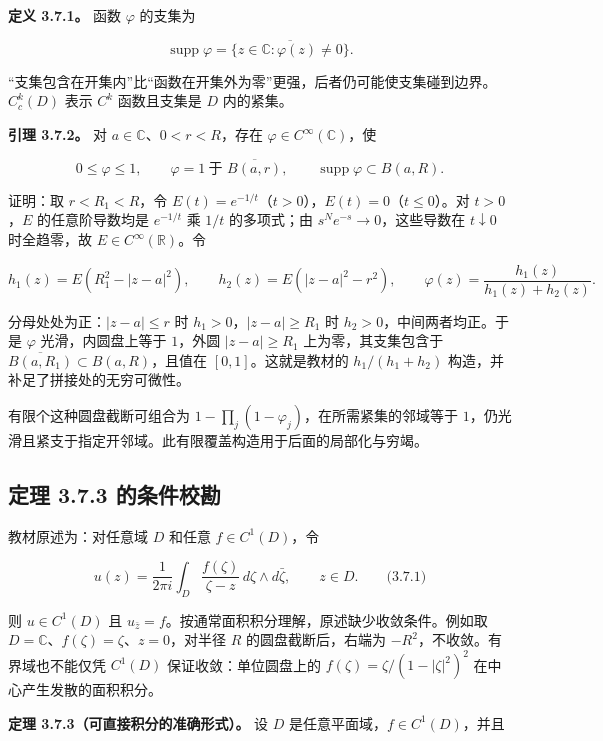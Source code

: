 \documentclass[11pt,a4paper]{article}
\begin{document}
\textbf{定义 3.7.1。} 函数 \(\varphi\) 的支集为

\[
\operatorname{supp}\varphi
=\overline{\{z\in\mathbb C:\varphi(z)\ne0\}}.
\]

``支集包含在开集内''比``函数在开集外为零''更强，后者仍可能使支集碰到边界。\(C_c^k(D)\)
表示 \(C^k\) 函数且支集是 \(D\) 内的紧集。

\textbf{引理 3.7.2。} 对 \(a\in\mathbb C\)、\(0<r<R\)，存在
\(\varphi\in C^\infty(\mathbb C)\)，使

\[
0\le\varphi\le1,\qquad
\varphi=1\ \text{于 }\overline{B(a,r)},\qquad
\operatorname{supp}\varphi\subset B(a,R).
\]

证明：取 \(r<R_1<R\)，令
\(E(t)=e^{-1/t}\)（\(t>0\)），\(E(t)=0\)（\(t\le0\)）。对 \(t>0\)，\(E\)
的任意阶导数均是 \(e^{-1/t}\) 乘 \(1/t\) 的多项式；由
\(s^Ne^{-s}\to0\)，这些导数在 \(t\downarrow0\) 时全趋零，故
\(E\in C^\infty(\mathbb R)\)。令

\[
h_1(z)=E(R_1^2-|z-a|^2),\qquad
h_2(z)=E(|z-a|^2-r^2),\qquad
\varphi(z)=\frac{h_1(z)}{h_1(z)+h_2(z)}.
\]

分母处处为正：\(|z-a|\le r\) 时 \(h_1>0\)，\(|z-a|\ge R_1\) 时
\(h_2>0\)，中间两者均正。于是 \(\varphi\) 光滑，内圆盘上等于 \(1\)，外圆
\(|z-a|\ge R_1\) 上为零，其支集包含于
\(\overline{B(a,R_1)}\subset B(a,R)\)，且值在 \([0,1]\)。这就是教材的
\(h_1/(h_1+h_2)\) 构造，并补足了拼接处的无穷可微性。

有限个这种圆盘截断可组合为
\(1-\prod_j(1-\varphi_j)\)，在所需紧集的邻域等于
\(1\)，仍光滑且紧支于指定开邻域。此有限覆盖构造用于后面的局部化与穷竭。

\subsection{定理 3.7.3
的条件校勘}\label{ch03-s7-ux5b9aux7406-373-ux7684ux6761ux4ef6ux6821ux52d8}

教材原述为：对任意域 \(D\) 和任意 \(f\in C^1(D)\)，令

\[
u(z)=\frac1{2\pi i}\int_D\frac{f(\zeta)}{\zeta-z}\,d\zeta\wedge d\bar\zeta,
\qquad z\in D.
\qquad\text{(3.7.1)}
\]

则 \(u\in C^1(D)\) 且
\(u_{\bar z}=f\)。按通常面积积分理解，原述缺少收敛条件。例如取
\(D=\mathbb C\)、\(f(\zeta)=\zeta\)、\(z=0\)，对半径 \(R\)
的圆盘截断后，右端为 \(-R^2\)，不收敛。有界域也不能仅凭 \(C^1(D)\)
保证收敛：单位圆盘上的 \(f(\zeta)=\zeta/(1-|\zeta|^2)^2\)
在中心产生发散的面积积分。

\textbf{定理 3.7.3（可直接积分的准确形式）。} 设 \(D\)
是任意平面域，\(f\in C^1(D)\)，并且
\end{document}

